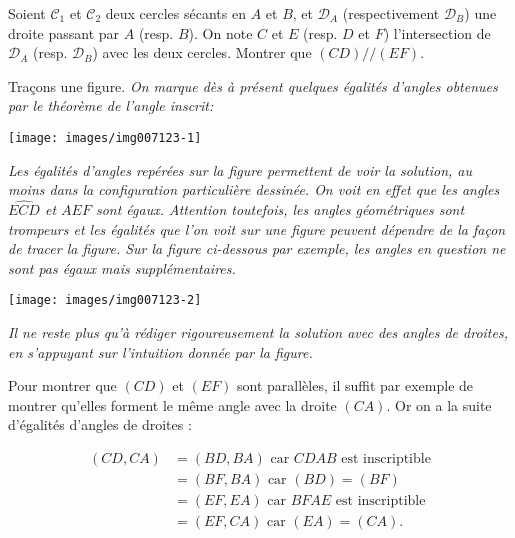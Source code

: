 \begin{exo}
Soient $\mathcal C_1$ et $\mathcal C_2$ deux cercles sécants en $A$ et $B$, et $\mathcal D_A$ (respectivement $\mathcal D_B$) une droite passant par $A$  (resp. $B$). On note $C$ et $E$ (resp. $D$ et $F$) l'intersection de $\mathcal D_A$ (resp. $\mathcal D_B$) avec 
 les deux cercles. Montrer que $(CD) // (EF)$.
 

\begin{sol} 
Traçons une figure. \emph{On marque dès à présent quelques égalités d'angles obtenues par le théorème de l'angle inscrit:}

\begin{center}
\texttt{[image: images/img007123-1]}
\end{center}

\emph{Les égalités d'angles repérées sur la figure permettent de voir la solution, au moins dans la configuration particulière dessinée. On voit en effet que les angles $\widehat{ECD}$ et $\widehat{AEF}$ sont égaux. Attention toutefois, les angles géométriques sont trompeurs et les égalités que l'on voit sur une figure peuvent dépendre de la façon de tracer la figure. Sur la figure ci-dessous par exemple, les angles en question ne sont pas égaux mais supplémentaires.}

\begin{center}
\texttt{[image: images/img007123-2]}
\end{center}


\emph{Il ne reste plus qu'à rédiger rigoureusement la solution  avec des angles de droites, en s'appuyant sur l'intuition donnée par la figure.}

Pour montrer que $(CD)$ et $(EF)$ sont parallèles, il suffit par exemple de montrer qu'elles forment le même angle avec la droite $(CA)$. Or on a la suite d'égalités d'angles de droites :

\begin{align*}
(CD,CA) &= (BD,BA) \text{ car $CDAB$ est inscriptible}\\
&= (BF,BA) \text{ car $(BD)=(BF)$}\\
&=(EF,EA) \text{ car $BFAE$ est inscriptible}\\
&=(EF,CA)  \text{ car $(EA)=(CA)$.}
\end{align*}

\end{sol}   
\end{exo}  



